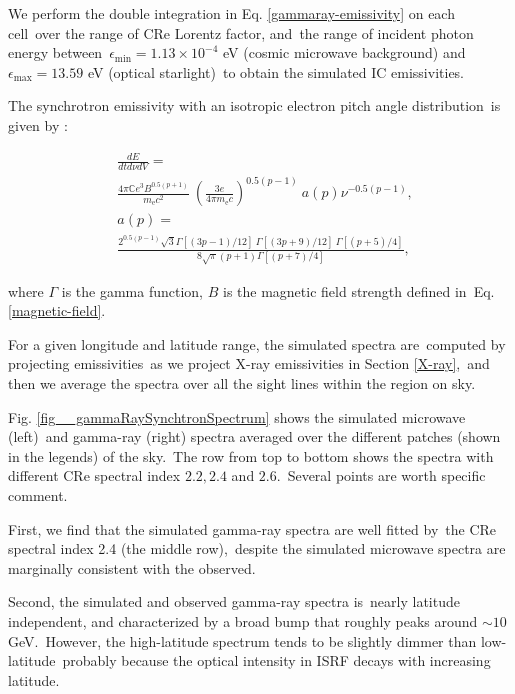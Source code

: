 \documentclass[fleqn,usenatbib,useAMS]{mnras}
\begin{document}
We perform the double integration in Eq. \ref{gammaray-emissivity} on each cell\
over the range of CRe Lorentz factor, and\
the range of incident photon energy between\
$\epsilon_{\text{min}}=1.13\times10^{-4}$ eV (cosmic microwave background) and\
$\epsilon_{\text{max}}=13.59$ eV (optical starlight)\
to obtain the simulated IC emissivities.


The synchrotron emissivity with an isotropic electron pitch angle distribution\
is given by \citet{BLUMENTHAL1970}:

\begin{subequations}
   \begin{align}
      &\frac{dE}{dtd\nu dV} =\nonumber\\
      &\frac{4\pi\mathbb{C}e^{3}B^{0.5(p+1)}}{m_{\text{e}}c^{2}}\
      \left(\frac{3e}{4\pi m_{\text{e}}c}\right)^{0.5(p-1)}\
      a(p)\nu^{-0.5(p-1)},\\
      &a(p)=\nonumber\\
           &\frac{2^{0.5(p-1)}\sqrt{3}\Gamma\left[\left(3p-1\right)/12\right]\
                                      \Gamma\left[\left(3p+9\right)/12\right]\
                                      \Gamma\left[\left(p+5\right)/4\right]}
      {8\sqrt{\pi}(p+1)\Gamma\left[\left(p+7\right)/4\right]},
   \end{align}
   \label{synchrotron-emissivity}
\end{subequations}

where $\Gamma$ is the gamma function, $B$ is the magnetic field strength defined in\
Eq. \ref{magnetic-field}.

For a given longitude and latitude range, the simulated spectra are\
computed by projecting emissivities\
as we project X-ray emissivities in Section \ref{X-ray},\
and then we average the spectra over all the sight lines within the region on sky.


Fig. \ref{fig__gammaRaySynchtronSpectrum} shows the simulated microwave (left)\
and gamma-ray (right) spectra averaged over the different patches (shown in the legends) of the sky.\
The row from top to bottom shows the spectra with different CRe spectral index $2.2, 2.4$ and $2.6$.\
Several points are worth specific comment.\

First, we find that the simulated gamma-ray spectra are well fitted by\
the CRe spectral index 2.4 (the middle row),\
despite the simulated microwave spectra are marginally consistent with the observed.

Second, the simulated and observed gamma-ray spectra is\
nearly latitude independent, and characterized by a broad bump that roughly peaks around $\sim10$ GeV.\
However, the high-latitude spectrum tends to be slightly dimmer than low-latitude\
probably because the optical intensity in ISRF decays with increasing latitude.
\end{document}
